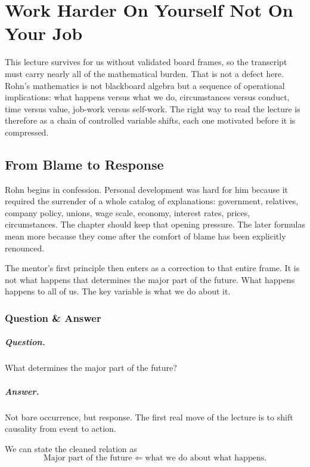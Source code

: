 \chapter{Work Harder On Yourself Not On Your Job}

This lecture survives for us without validated board frames, so the transcript must carry nearly all of the mathematical burden. That is not a defect here. Rohn's mathematics is not blackboard algebra but a sequence of operational implications: what happens versus what we do, circumstances versus conduct, time versus value, job-work versus self-work. The right way to read the lecture is therefore as a chain of controlled variable shifts, each one motivated before it is compressed.

\section{From Blame to Response}

Rohn begins in confession. Personal development was hard for him because it required the surrender of a whole catalog of explanations: government, relatives, company policy, unions, wage scale, economy, interest rates, prices, circumstances. The chapter should keep that opening pressure. The later formulas mean more because they come after the comfort of blame has been explicitly renounced.

The mentor's first principle then enters as a correction to that entire frame. It is not what happens that determines the major part of the future. What happens happens to all of us. The key variable is what we do about it.

\subsection{Question \& Answer}

\paragraph{Question.} What determines the major part of the future?

\paragraph{Answer.} Not bare occurrence, but response. The first real move of the lecture is to shift causality from event to action.

We can state the cleaned relation as
\begin{equation}
\text{Major part of the future} \Longleftarrow \text{what we do about what happens}.
\end{equation}

